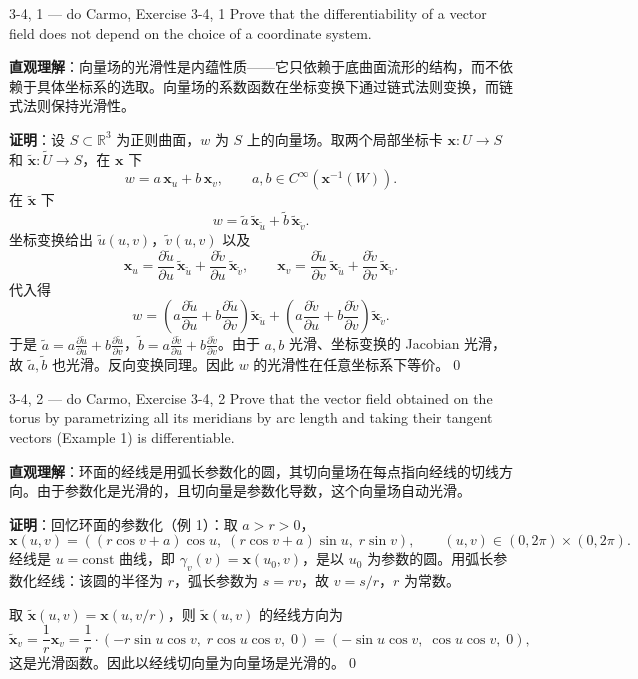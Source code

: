 \begin{exercise}{3-4, 1 — do Carmo, Exercise 3-4, 1}
Prove that the differentiability of a vector field does not depend on the choice of a coordinate system.
\end{exercise}
\begin{solution}
\textbf{直观理解}：向量场的光滑性是内蕴性质——它只依赖于底曲面流形的结构，而不依赖于具体坐标系的选取。向量场的系数函数在坐标变换下通过链式法则变换，而链式法则保持光滑性。

\textbf{证明}：设 $S \subset \mathbb{R}^3$ 为正则曲面，$w$ 为 $S$ 上的向量场。取两个局部坐标卡 $\mathbf{x}\colon U\to S$ 和 $\tilde{\mathbf{x}}\colon \tilde{U}\to S$，在 $\mathbf{x}$ 下
\[
w = a\,\mathbf{x}_u + b\,\mathbf{x}_v,\qquad a,b\in C^\infty(\mathbf{x}^{-1}(W)).
\]
在 $\tilde{\mathbf{x}}$ 下
\[
w = \tilde{a}\,\tilde{\mathbf{x}}_{\tilde{u}} + \tilde{b}\,\tilde{\mathbf{x}}_{\tilde{v}}.
\]
坐标变换给出 $\tilde{u}(u,v)$，$\tilde{v}(u,v)$ 以及
\[
\mathbf{x}_u = \frac{\partial \tilde{u}}{\partial u}\,\tilde{\mathbf{x}}_{\tilde{u}} + \frac{\partial \tilde{v}}{\partial u}\,\tilde{\mathbf{x}}_{\tilde{v}},\qquad
\mathbf{x}_v = \frac{\partial \tilde{u}}{\partial v}\,\tilde{\mathbf{x}}_{\tilde{u}} + \frac{\partial \tilde{v}}{\partial v}\,\tilde{\mathbf{x}}_{\tilde{v}}.
\]
代入得
\[
w = \left(a\frac{\partial \tilde{u}}{\partial u} + b\frac{\partial \tilde{u}}{\partial v}\right)\tilde{\mathbf{x}}_{\tilde{u}} + \left(a\frac{\partial \tilde{v}}{\partial u} + b\frac{\partial \tilde{v}}{\partial v}\right)\tilde{\mathbf{x}}_{\tilde{v}}.
\]
于是 $\tilde{a} = a\frac{\partial \tilde{u}}{\partial u} + b\frac{\partial \tilde{u}}{\partial v}$，$\tilde{b} = a\frac{\partial \tilde{v}}{\partial u} + b\frac{\partial \tilde{v}}{\partial v}$。由于 $a,b$ 光滑、坐标变换的 Jacobian 光滑，故 $\tilde{a},\tilde{b}$ 也光滑。反向变换同理。因此 $w$ 的光滑性在任意坐标系下等价。\qed
\end{solution}

\begin{exercise}{3-4, 2 — do Carmo, Exercise 3-4, 2}
Prove that the vector field obtained on the torus by parametrizing all its meridians by arc length and taking their tangent vectors (Example 1) is differentiable.
\end{exercise}
\begin{solution}
\textbf{直观理解}：环面的经线是用弧长参数化的圆，其切向量场在每点指向经线的切线方向。由于参数化是光滑的，且切向量是参数化导数，这个向量场自动光滑。

\textbf{证明}：回忆环面的参数化（例 1）：取 $a > r > 0$，
\[
\mathbf{x}(u,v) = ((r\cos v+a)\cos u,\;(r\cos v+a)\sin u,\;r\sin v),\qquad (u,v)\in(0,2\pi)\times(0,2\pi).
\]
经线是 $u=\mathrm{const}$ 曲线，即 $\gamma_v(v) = \mathbf{x}(u_0,v)$，是以 $u_0$ 为参数的圆。用弧长参数化经线：该圆的半径为 $r$，弧长参数为 $s = rv$，故 $v = s/r$，$r$ 为常数。

取 $\tilde{\mathbf{x}}(u,v) = \mathbf{x}(u, v/r)$，则 $\tilde{\mathbf{x}}(u,v)$ 的经线方向为
\[
\tilde{\mathbf{x}}_v = \frac{1}{r}\mathbf{x}_v = \frac{1}{r}\cdot(-r\sin u\cos v,\;r\cos u\cos v,\;0) = (-\sin u\cos v,\;\cos u\cos v,\;0),
\]
这是光滑函数。因此以经线切向量为向量场是光滑的。\qed
\end{solution}


